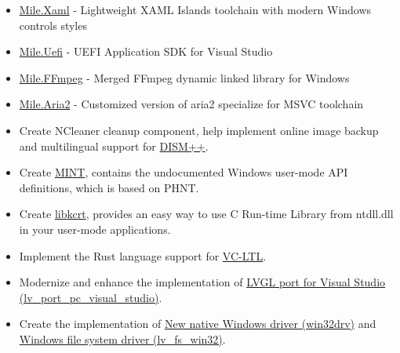\documentclass{resume}
\begin{document}
\begin{itemize}
  \item \href{https://github.com/ProjectMile/Mile.Xaml}{Mile.Xaml} - Lightweight XAML Islands toolchain with modern Windows controls styles
  \item \href{https://github.com/ProjectMile/Mile.Uefi}{Mile.Uefi} - UEFI Application SDK for Visual Studio
  \item \href{https://github.com/ProjectMile/Mile.FFmpeg}{Mile.FFmpeg} - Merged FFmpeg dynamic linked library for Windows
  \item \href{https://github.com/ProjectMile/Mile.Aria2}{Mile.Aria2} - Customized version of aria2 specialize for MSVC toolchain
\end{itemize} 

\begin{itemize}
  \item Create NCleaner cleanup component, help implement online image backup and multilingual support for \href{https://github.com/Chuyu-Team/Dism-Multi-language/releases/latest}{DISM++}.
  \item Create \href{https://github.com/Chuyu-Team/MINT}{MINT}, contains the undocumented Windows user-mode API definitions, which is based on PHNT.
  \item Create \href{https://github.com/Chuyu-Team/libkcrt}{libkcrt}, provides an easy way to use C Run-time Library from ntdll.dll in your user-mode applications.
  \item Implement the Rust language support for \href{https://github.com/Chuyu-Team/VC-LTL5}{VC-LTL}.
\end{itemize}

\begin{itemize}
  \item Modernize and enhance the implementation of \href{https://github.com/lvgl/lv_port_pc_visual_studio}{LVGL port for Visual Studio (lv\_port\_pc\_visual\_studio)}.
  \item Create the implementation of \href{https://github.com/lvgl/lv_drivers/pull/117}{New native Windows driver (win32drv)} and \href{https://github.com/lvgl/lvgl/pull/2701}{Windows file system driver (lv\_fs\_win32)}.
\end{itemize}
\end{document}
